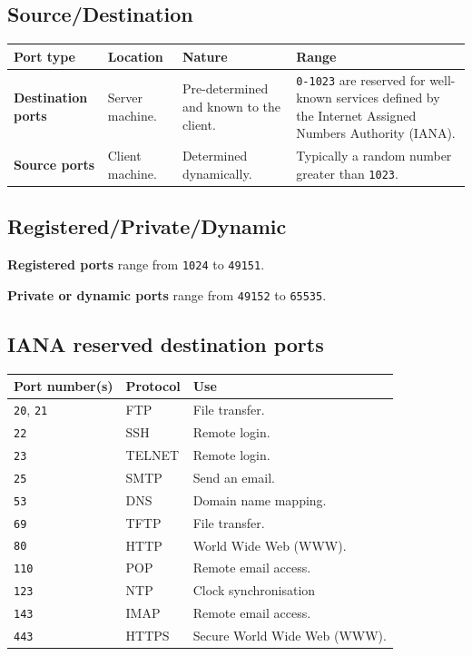 \documentclass[a4paper]{systems-software}
\begin{document}
\subsection*{Source/Destination}

\begin{longtabu} to \textwidth {| X[1,l] | X[1,l] | X[2,l] | X[2, l] |}
	\hline
	\textbf{Port type} & \textbf{Location} & \textbf{Nature} & \textbf{Range}
	\\ \hline
	\textbf{Destination ports} & Server machine. &
	Pre-determined and known to the client. &
	\texttt{0-1023} are reserved for well-known services defined by the Internet Assigned Numbers Authority (IANA).
	\\ \hline
	\textbf{Source ports} & Client machine. &
	Determined dynamically. &
	Typically a random number greater than \texttt{1023}.
	\\ \hline
\end{longtabu}


\subsection*{Registered/Private/Dynamic}

\textbf{Registered ports} range from \texttt{1024} to \texttt{49151}.

\textbf{Private or dynamic ports} range from \texttt{49152} to \texttt{65535}.


\newpage

\subsection*{IANA reserved destination ports}

\begin{longtabu} to \textwidth {| X[1,l] | X[1,l] | X[4,l] |}
	\hline
	\textbf{Port number(s)} & \textbf{Protocol} & \textbf{Use}
	\\ \hline
	\texttt{20}, \texttt{21} & FTP & File transfer.
	\\ \hline
	\texttt{22} & SSH & Remote login.
	\\ \hline
	\texttt{23} & TELNET & Remote login.
	\\ \hline
	\texttt{25} & SMTP & Send an email.
	\\ \hline
	\texttt{53} & DNS & Domain name mapping.
	\\ \hline
	\texttt{69} & TFTP & File transfer.
	\\ \hline
	\texttt{80} & HTTP & World Wide Web (WWW).
	\\ \hline
	\texttt{110} & POP & Remote email access.
	\\ \hline
	\texttt{123} & NTP & Clock synchronisation
	\\ \hline
	\texttt{143} & IMAP & Remote email access.
	\\ \hline
	\texttt{443} & HTTPS & Secure World Wide Web (WWW).
	\\ \hline
\end{longtabu}
\end{document}
